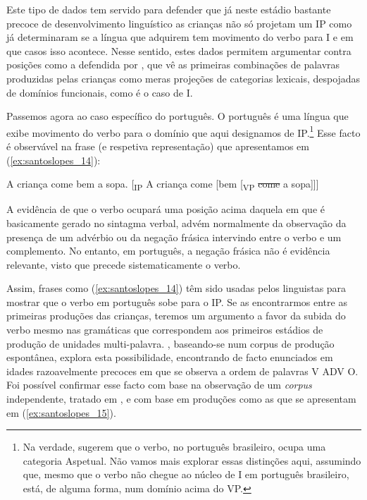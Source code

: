 \documentclass[output=paper]{LSP/langsci}
\begin{document}
Este tipo de dados tem servido para defender que já neste estádio bastante precoce de desenvolvimento linguístico as crianças não só projetam um IP como já determinaram se a língua que adquirem tem movimento do verbo para I e em que casos isso acontece. Nesse sentido, estes dados permitem argumentar contra posições como a defendida por \citet{radford1988}, que vê as primeiras combinações de palavras produzidas pelas crianças como meras projeções de categorias lexicais, despojadas de domínios funcionais, como é o caso de I.

Passemos agora ao caso específico do português. O português é uma língua que exibe movimento do verbo para o domínio que aqui designamos de IP.\footnote{Na verdade, \citet{cyrino_matos2002} sugerem que o verbo, no português brasileiro, ocupa uma categoria Aspetual. Não vamos mais explorar essas distinções aqui, assumindo que, mesmo que o verbo não chegue ao núcleo de I em português brasileiro, está, de alguma forma, num domínio acima do VP.} Esse facto é observável na frase (e respetiva representação) que apresentamos em (\ref{ex:santoslopes_14}):

\ea\label{ex:santoslopes_14}
\ea\label{ex:santoslopes_14a}
A criança come bem a sopa.
\ex\label{ex:santoslopes_14b}
[\textsubscript{IP} A criança come [bem [\textsubscript{VP} \sout{come} a sopa]]]
\zl

A evidência de que o verbo ocupará uma posição acima daquela em que é basicamente gerado no sintagma verbal, advém normalmente da observação da presença de um advérbio ou da negação frásica intervindo entre o verbo e um complemento. No entanto, em português, a negação frásica não é evidência relevante, visto que precede sistematicamente o verbo.

Assim, frases como (\ref{ex:santoslopes_14}) têm sido usadas pelos linguistas para mostrar que o verbo em português sobe para o IP. Se as encontrarmos entre as primeiras produções das crianças, teremos um argumento a favor da subida do verbo mesmo nas gramáticas que correspondem aos primeiros estádios de produção de unidades multi-palavra. \citet{goncalves2004,goncalves2006}, baseando-se num corpus de produção espontânea, explora esta possibilidade, encontrando de facto enunciados em idades razoavelmente precoces em que se observa a ordem de palavras V ADV O. Foi possível confirmar esse facto com base na observação de um \textit{corpus} independente, tratado em \citet{santos2006}, e com base em produções como as que se apresentam em (\ref{ex:santoslopes_15}).
\end{document}
